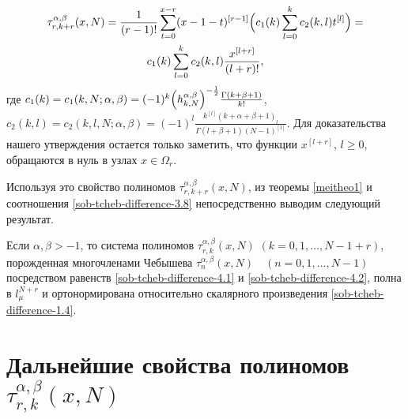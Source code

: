 \begin{multline}\label{sob-tcheb-difference-tauRepresent}
\tau_{r,k+r}^{\alpha, \beta}(x,N)=
\frac{1}{(r-1)!}
\sum\limits_{t=0}^{x-r}(x-1-t)^{[r-1]}
\Bigl(
c_1(k)\sum\limits_{l=0}^{k}c_2(k,l)t^{[l]}
\Bigr)=\\
c_1(k)\sum\limits_{l=0}^{k}
c_2(k,l)\frac{x^{[l+r]}}{(l+r)!},
\end{multline}
где $c_1(k)=c_1(k,N; \alpha, \beta) = (-1)^k\Bigl(h_{k,N}^{\alpha, \beta}\Bigr)^{-\frac{1}{2}} \frac{\Gamma(k+\beta+1)}{k!}$,
$c_2(k,l)=c_2(k,l,N; \alpha, \beta) = (-1)^l \frac{k^{[l]}(k+\alpha+\beta+1)_l}{\Gamma(l+\beta+1)(N-1)^{[l]}}$.
Для доказательства нашего утверждения остается только заметить, что функции $x^{[l+r]}$, $l \ge 0$, обращаются в нуль в узлах $x \in \Omega_r$.

Используя это свойство полиномов $\tau_{r,k+r}^{\alpha, \beta}(x,N)$, из теоремы \ref{meitheo1} и соотношения \eqref{sob-tcheb-difference-3.8} непосредственно выводим  следующий результат.

\begin{theorem} Если $\alpha,\beta>-1$, то система полиномов $\tau_{r,k}^{\alpha,\beta}(x,N)$ $(k=0, 1,\ldots, N-1+r)$, порожденная многочленами Чебышева $\tau_n^{\alpha,\beta}(x,N)\quad(n=0,1,\ldots, N-1)$ посредством равенств \eqref{sob-tcheb-difference-4.1} и \eqref{sob-tcheb-difference-4.2}, полна  в $l_\mu^{N+r}$ и ортонормирована относительно скалярного произведения \eqref{sob-tcheb-difference-1.4}.
 \end{theorem}

\section{Дальнейшие свойства полиномов $\tau_{r,k}^{\alpha,\beta}(x,N)$ }


